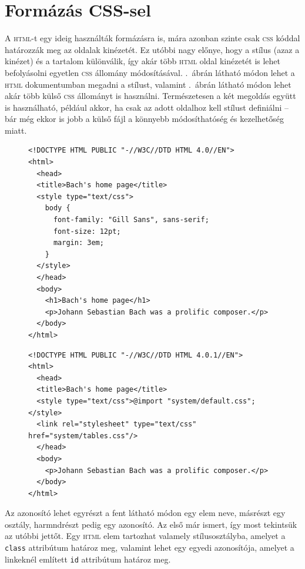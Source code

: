 \section{Formázás CSS-sel}\label{sec:html-css}
A \textsc{html}-t egy ideig használták formázásra is, mára azonban szinte csak
\textsc{css} kóddal határozzák meg az oldalak kinézetét. Ez utóbbi nagy előnye,
hogy a stílus (azaz a kinézet) és a tartalom különválik, így akár több
\textsc{html} oldal kinézetét is lehet befolyásolni egyetlen \textsc{css}
állomány módosításával. .\ ábrán látható módon lehet a
\textsc{html} dokumentumban megadni a stílust, valamint
.\ ábrán látható módon lehet akár több külső
\textsc{css} állományt is használni. Természetesen a két megoldás együtt is
használható, például akkor, ha csak az adott oldalhoz kell stílust definiálni
-- bár még ekkor is jobb a külső fájl a könnyebb módosíthatóség és kezelhetőség
miatt.


\begin{figure}[tbh]
\begin{Verbatim}[frame=single]
<!DOCTYPE HTML PUBLIC "-//W3C//DTD HTML 4.0//EN">
<html>
  <head>
  <title>Bach's home page</title>
  <style type="text/css">
    body { 
      font-family: "Gill Sans", sans-serif;
      font-size: 12pt;
      margin: 3em; 
    }
  </style>
  </head>
  <body>
    <h1>Bach's home page</h1>
    <p>Johann Sebastian Bach was a prolific composer.</p>
  </body>
</html>
\end{Verbatim}
\caption{}
\label{fig:html-css-head}
\end{figure}

\begin{figure}[tbh]
\begin{Verbatim}[frame=single]
<!DOCTYPE HTML PUBLIC "-//W3C//DTD HTML 4.0.1//EN">
<html>
  <head>
  <title>Bach's home page</title>
  <style type="text/css">@import "system/default.css";</style>
  <link rel="stylesheet" type="text/css" href="system/tables.css"/>
  </head>
  <body>
    <p>Johann Sebastian Bach was a prolific composer.</p>
  </body>
</html>
\end{Verbatim}
\caption{}
\label{fig:html-css-external}
\end{figure}



Az azonosító lehet egyrészt a fent látható módon egy elem neve,
másrészt egy osztály, harmndrészt pedig egy azonosító. Az első már ismert, így
most tekintsük az utóbbi jettőt. Egy \textsc{html} elem tartozhat valamely
stílusosztályba, amelyet a \texttt{class} attribútum határoz meg, valamint lehet
egy egyedi azonosítója, amelyet a linkeknél említett \texttt{id} attribútum
határoz meg.

